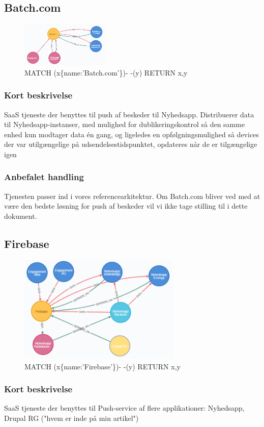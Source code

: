 \documentclass{article}
\begin{document}
\subsection{Batch.com}
\begin{figure}[h]
\includegraphics[width=120pt]{Batch-com.PNG}
\caption{MATCH (x\{name:'Batch.com'\})- -(y) RETURN x,y}
\end{figure}
\subsubsection*{Kort beskrivelse}
SaaS tjeneste der benyttes til push af beskeder til Nyhedsapp.
Distribuerer data til Nyhedsapp-instanser, med mulighed for dublikeringskontrol så den samme enhed kun modtager data én gang, og ligeledes en opfølgningsmulighed så devices der var utilgængelige på udsendelsestidspunktet, opdateres når de er tilgængelige igen
\subsubsection*{Anbefalet handling}
Tjenesten passer ind i vores referencearkitektur. Om Batch.com bliver ved med at være den bedste løsning for push af beskeder vil vi ikke tage stilling til i dette dokument.


\subsection{Firebase}
\begin{figure}[h]
\includegraphics[width=220pt]{Firebase.PNG}
\caption{MATCH (x\{name:'Firebase'\})- -(y) RETURN x,y}
\end{figure}
\subsubsection*{Kort beskrivelse}
SaaS tjeneste der benyttes til Push-service af flere applikationer:
Nyhedsapp, Drupal RG ("hvem er inde på min artikel")
\end{document}
